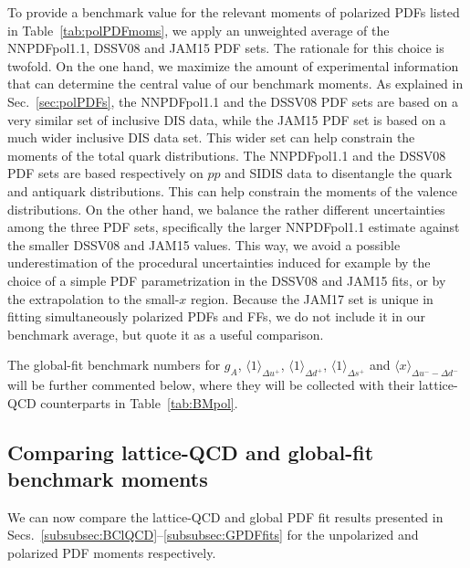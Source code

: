 To provide a benchmark value for the relevant moments of 
polarized PDFs listed in Table~\ref{tab:polPDFmoms}, we apply an unweighted 
average of the NNPDFpol1.1, DSSV08 and JAM15 PDF sets.
%
The rationale for this choice is twofold.
%
On the one hand, we maximize the amount of experimental information 
that can determine the central value of our benchmark moments.
%
As explained in Sec.~\ref{sec:polPDFs}, the NNPDFpol1.1 and the DSSV08 PDF 
sets are based on a very similar set of inclusive DIS data, while the JAM15 
PDF set is based on a much wider inclusive DIS data set.
%
This wider set can help constrain the moments of the total quark 
distributions.
%
The NNPDFpol1.1 and the DSSV08 PDF sets are based respectively on $pp$ and 
SIDIS data to disentangle the quark and antiquark distributions.
%
This can help constrain the moments of the valence distributions.
%
On the other hand, we balance the rather different uncertainties among the 
three PDF sets, specifically the larger NNPDFpol1.1 estimate
against the smaller DSSV08 and JAM15 values.
%
This way, we avoid a possible underestimation of the procedural uncertainties 
induced for example by the choice of a simple PDF parametrization 
in the DSSV08 and JAM15 fits, or by the extrapolation to the small-$x$ region.
%
Because the JAM17 set is unique in fitting simultaneously polarized PDFs and 
FFs, we do not include it in our benchmark average, but quote it as a useful 
comparison.

The global-fit benchmark numbers for $g_A$,
$\langle 1 \rangle_{\Delta u^+}$, $\langle 1 \rangle_{\Delta d^+}$,
$\langle 1 \rangle_{\Delta s^+}$ and $\langle x \rangle_{\Delta u^- - \Delta d^-}$
will be further commented below, where they will be collected
with their lattice-QCD counterparts in Table~\ref{tab:BMpol}.

\subsection{Comparing lattice-QCD and global-fit benchmark moments}
\label{subsec:BN}

We can now compare the lattice-QCD and global PDF fit results presented in 
Secs.~\ref{subsubsec:BClQCD}--\ref{subsubsec:GPDFfits} for the unpolarized
and polarized PDF moments respectively.

